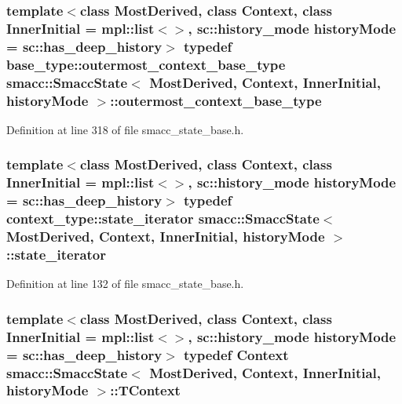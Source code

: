 \subsubsection[{\texorpdfstring{outermost\+\_\+context\+\_\+base\+\_\+type}{outermost_context_base_type}}]{\setlength{\rightskip}{0pt plus 5cm}template$<$class Most\+Derived, class Context, class Inner\+Initial = mpl\+::list$<$$>$, sc\+::history\+\_\+mode history\+Mode = sc\+::has\+\_\+deep\+\_\+history$>$ typedef base\+\_\+type\+::outermost\+\_\+context\+\_\+base\+\_\+type {\bf smacc\+::\+Smacc\+State}$<$ Most\+Derived, Context, Inner\+Initial, history\+Mode $>$\+::{\bf outermost\+\_\+context\+\_\+base\+\_\+type}}\hypertarget{classsmacc_1_1SmaccState_aaf76bbe2aa9dd73e3284605f84ab4b16}{}\label{classsmacc_1_1SmaccState_aaf76bbe2aa9dd73e3284605f84ab4b16}


Definition at line 318 of file smacc\+\_\+state\+\_\+base.\+h.

\subsubsection[{\texorpdfstring{state\+\_\+iterator}{state_iterator}}]{\setlength{\rightskip}{0pt plus 5cm}template$<$class Most\+Derived, class Context, class Inner\+Initial = mpl\+::list$<$$>$, sc\+::history\+\_\+mode history\+Mode = sc\+::has\+\_\+deep\+\_\+history$>$ typedef context\+\_\+type\+::state\+\_\+iterator {\bf smacc\+::\+Smacc\+State}$<$ Most\+Derived, Context, Inner\+Initial, history\+Mode $>$\+::{\bf state\+\_\+iterator}}\hypertarget{classsmacc_1_1SmaccState_a12497b38e710f07cacb5d45efc024339}{}\label{classsmacc_1_1SmaccState_a12497b38e710f07cacb5d45efc024339}


Definition at line 132 of file smacc\+\_\+state\+\_\+base.\+h.

\subsubsection[{\texorpdfstring{T\+Context}{TContext}}]{\setlength{\rightskip}{0pt plus 5cm}template$<$class Most\+Derived, class Context, class Inner\+Initial = mpl\+::list$<$$>$, sc\+::history\+\_\+mode history\+Mode = sc\+::has\+\_\+deep\+\_\+history$>$ typedef Context {\bf smacc\+::\+Smacc\+State}$<$ Most\+Derived, Context, Inner\+Initial, history\+Mode $>$\+::{\bf T\+Context}}\hypertarget{classsmacc_1_1SmaccState_a9953ba0428a8c46f7d72c70bc3f87db4}{}\label{classsmacc_1_1SmaccState_a9953ba0428a8c46f7d72c70bc3f87db4}


